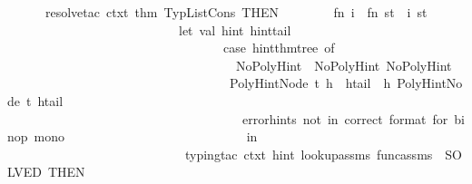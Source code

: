 \begin{isabellebody}
\ \ \ \ \ \ {\isacharparenleft}{\kern0pt}resolve{\isacharunderscore}{\kern0pt}tac\ ctxt\ {\isacharbrackleft}{\kern0pt}{\isacharat}{\kern0pt}{\isacharbraceleft}{\kern0pt}thm\ TypListCons{\isacharbraceright}{\kern0pt}{\isacharbrackright}{\kern0pt}\ THEN{\isacharprime}{\kern0pt}\ \isanewline
\ \ \ \ \ \ \ {\isacharparenleft}{\kern0pt}fn\ i\ {\isacharequal}{\kern0pt}{\isachargreater}{\kern0pt}\ fn\ st\ {\isacharequal}{\kern0pt}{\isachargreater}{\kern0pt}\ {\isacharparenleft}{\kern0pt}i{\isacharcomma}{\kern0pt}\ st{\isacharparenright}{\kern0pt}\ {\isacharbar}{\kern0pt}{\isacharminus}{\kern0pt}{\isachargreater}{\kern0pt}\ \isanewline
\ \ \ \ \ \ \ \ \ \ \ \ \ \ \ \ \ \ \ \ \ \ \ \ \ \ {\isacharparenleft}{\kern0pt}\ let\ val\ {\isacharparenleft}{\kern0pt}hint{}{\isacharcomma}{\kern0pt}\ hint{\isacharunderscore}{\kern0pt}tail{\isacharparenright}{\kern0pt}\ {\isacharequal}{\kern0pt}\ \isanewline
\ \ \ \ \ \ \ \ \ \ \ \ \ \ \ \ \ \ \ \ \ \ \ \ \ \ \ \ \ \ \ \ \ \ case\ hint{\isacharunderscore}{\kern0pt}thm{\isacharunderscore}{\kern0pt}tree\ of\isanewline
\ \ \ \ \ \ \ \ \ \ \ \ \ \ \ \ \ \ \ \ \ \ \ \ \ \ \ \ \ \ \ \ \ \ \ \ NoPolyHint\ {\isacharequal}{\kern0pt}{\isachargreater}{\kern0pt}\ {\isacharparenleft}{\kern0pt}NoPolyHint{\isacharcomma}{\kern0pt}\ NoPolyHint{\isacharparenright}{\kern0pt}\isanewline
\ \ \ \ \ \ \ \ \ \ \ \ \ \ \ \ \ \ \ \ \ \ \ \ \ \ \ \ \ \ \ \ \ \ {\isacharbar}{\kern0pt}\ PolyHintNode\ {\isacharparenleft}{\kern0pt}t{\isacharcomma}{\kern0pt}\ h{}\ {\isacharcolon}{\kern0pt}{\isacharcolon}{\kern0pt}\ htail{\isacharparenright}{\kern0pt}\ {\isacharequal}{\kern0pt}{\isachargreater}{\kern0pt}\ {\isacharparenleft}{\kern0pt}h{}{\isacharcomma}{\kern0pt}\ PolyHintNode\ {\isacharparenleft}{\kern0pt}t{\isacharcomma}{\kern0pt}\ htail{\isacharparenright}{\kern0pt}{\isacharparenright}{\kern0pt}\isanewline
\ \ \ \ \ \ \ \ \ \ \ \ \ \ \ \ \ \ \ \ \ \ \ \ \ \ \ \ \ \ \ \ \ \ {\isacharbar}{\kern0pt}\ {\isacharunderscore}{\kern0pt}\ {\isacharequal}{\kern0pt}{\isachargreater}{\kern0pt}\ error{\isacharparenleft}{\kern0pt}{\isachardoublequote}{\kern0pt}hints\ not\ in\ correct\ format\ for\ binop\ mono{\isachardoublequote}{\kern0pt}{\isacharparenright}{\kern0pt}\isanewline
\ \ \ \ \ \ \ \ \ \ \ \ \ \ \ \ \ \ \ \ \ \ \ \ \ \ \ \ in\isanewline
\ \ \ \ \ \ \ \ \ \ \ \ \ \ \ \ \ \ \ \ \ \ \ \ \ \ \ \ {\isacharparenleft}{\kern0pt}typing{\isacharunderscore}{\kern0pt}tac\ ctxt\ hint{}\ lookup{\isacharunderscore}{\kern0pt}assms\ func{\isacharunderscore}{\kern0pt}assms\ {\isacharbar}{\kern0pt}{\isachargreater}{\kern0pt}\ SOLVED{\isacharprime}{\kern0pt}{\isacharparenright}{\kern0pt}\ THEN{\isacharprime}{\kern0pt}\ \isanewline

\end{isabellebody}
